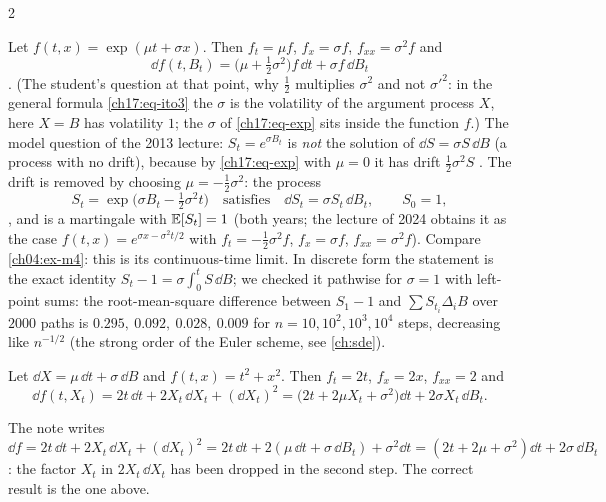\begin{paracol}{2}
\begin{example}\label{ch17:ex-exp}
Let $f(t,x)=\exp(\mu t+\sigma x)$. Then $f_t=\mu f$, $f_x=\sigma f$, $f_{xx}=\sigma^2f$ and
\begin{equation}\label{ch17:eq-exp}
  \dd f(t,B_t)=\bigl(\mu+\tfrac12\sigma^2\bigr)f\,\dd t+\sigma f\,\dd B_t
\end{equation}
. (The student's question at that point, why $\tfrac12$ multiplies $\sigma^2$ and not $\sigma'^2$: in the general formula
\eqref{ch17:eq-ito3} the $\sigma$ is the volatility of the argument process $X$, here $X=B$ has volatility $1$; the $\sigma$ of \eqref{ch17:eq-exp} sits inside the function $f$.)
The model question of the 2013 lecture: $S_t=e^{\sigma B_t}$ is \emph{not} the solution of $\dd S=\sigma S\,\dd B$ (a process with no drift), because by \eqref{ch17:eq-exp} with $\mu=0$ it has drift $\tfrac12\sigma^2S$
. The drift is removed by choosing $\mu=-\tfrac12\sigma^2$: the process
\begin{equation}\label{ch17:eq-expmart}
  S_t=\exp\bigl(\sigma B_t-\tfrac12\sigma^2t\bigr)\quad\text{satisfies}\quad\dd S_t=\sigma S_t\,\dd B_t,\qquad S_0=1,
\end{equation}
, and is a martingale with $\mathbb{E}[S_t]=1$ (both years; the lecture of 2024 obtains it as the case $f(t,x)=e^{\sigma x-\sigma^2t/2}$ with $f_t=-\tfrac12\sigma^2f$, $f_x=\sigma f$, $f_{xx}=\sigma^2f$). Compare
\cref{ch04:ex-m4}: this is its continuous-time limit.
In discrete form the statement is the exact identity $S_t-1=\sigma\int_0^tS\,\dd B$; we checked it pathwise for $\sigma=1$ with left-point sums: the root-mean-square difference between
$S_1-1$ and $\sum S_{t_i}\Delta_iB$ over $2000$ paths is $0.295,\ 0.092,\ 0.028,\ 0.009$ for $n=10,10^2,10^3,10^4$ steps, decreasing like $n^{-1/2}$ (the strong order of the Euler scheme, see \cref{ch:sde}).
\end{example}

\begin{example}\label{ch17:ex-tx}
Let $\dd X=\mu\,\dd t+\sigma\,\dd B$ and $f(t,x)=t^2+x^2$. Then $f_t=2t$, $f_x=2x$, $f_{xx}=2$ and
\[
  \dd f(t,X_t)=2t\,\dd t+2X_t\,\dd X_t+(\dd X_t)^2=\bigl(2t+2\mu X_t+\sigma^2\bigr)\dd t+2\sigma X_t\,\dd B_t .
\]
\end{example}
\begin{coursenote}
The note writes $\dd f=2t\,\dd t+2X_t\,\dd X_t+(\dd X_t)^2=2t\,\dd t+2(\mu\,\dd t+\sigma\,\dd B_t)+\sigma^2\dd t=(2t+2\mu+\sigma^2)\dd t+2\sigma\,\dd B_t$: the factor $X_t$ in
$2X_t\,\dd X_t$ has been dropped in the second step. The correct result is the one above.
\end{coursenote}


\end{paracol}
